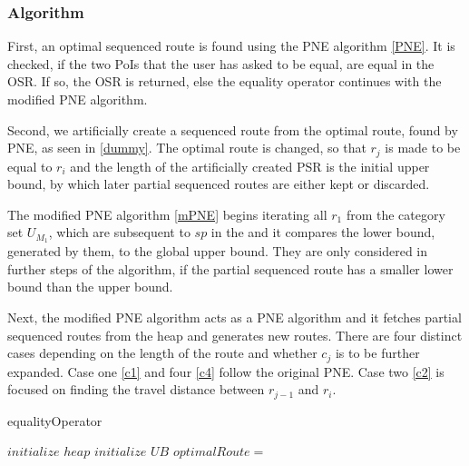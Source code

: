 \subsubsection{Algorithm}
First, an optimal sequenced route is found using the PNE algorithm \ref{PNE}. It is checked, if the two PoIs that the user has asked to be equal, are equal in the OSR. If so, the OSR is returned, else the equality operator continues with the modified PNE algorithm.

Second, we artificially create a sequenced route from the optimal route, found by PNE, as seen in \ref{dummy}. The optimal route is changed, so that $r_j$ is made to be equal to $r_i$ and the length of the artificially created PSR is the initial upper bound, by which later partial sequenced routes are either kept or discarded.

The modified PNE algorithm \ref{mPNE} begins iterating all $r_1$ from the category set $U_{M_1}$, which are subsequent to $sp$ in the and it compares the lower bound, generated by them, to the global upper bound. They are only considered in further steps of the algorithm, if the partial sequenced route has a smaller lower bound than the upper bound.

Next, the modified PNE algorithm acts as a PNE algorithm and it fetches partial sequenced routes from the heap and generates new routes. There are four distinct cases depending on the length of the route and whether $c_j$ is to be further expanded. Case one \ref{c1} and four \ref{c4} follow the original PNE. Case two \ref{c2} is focused on finding the travel distance between $r_{j-1}$ and $r_i$.




\begin{algorithm}
	\label{equality}
	\caption{equalityOperator}
	
	
	\BlankLine
	
	$initialize$ $heap$\; 
	$initialize$ $UB$\; 
	$optimalRoute =$\;
	{
		\dummySR{}\;
		\modifiedPNE{}\;
	}
\end{algorithm}

